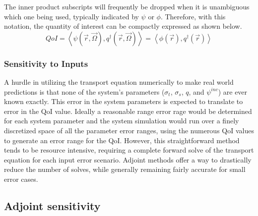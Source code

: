 \documentclass{article}
\newcommand{\vr}{\vec{r}}
\newcommand{\vO}{\vec{\Omega}}
\newcommand{\bra}{\left\langle}
\newcommand{\ket}{\right\rangle}
\newcommand{\sigt}{\sigma_t}
\newcommand{\sigs}{\sigma_s}
\newcommand{\angResp}{q^\dag}
\newcommand{\scalResp}{q^\dag}
\newcommand{\qoi}{QoI}
\begin{document}
The inner product subscripts will frequently be dropped when it is unambiguous which one being used, typically indicated by $\psi$ or $\phi$. Therefore, with this notation, the quantity of interest can be compactly expressed as shown below.
\begin{equation}
\label{QoIDef}
\qoi = \bra \psi(\vr,\vO), \angResp(\vr,\vO) \ket = \bra \phi(\vr) , \scalResp(\vr) \ket
\end{equation}

\subsubsection{Sensitivity to Inputs}
A hurdle in utilizing the transport equation numerically to make real world predictions is that none of the system's parameters ($\sigt$, $\sigs$, $q$, and $\psi^{inc}$) are ever known exactly. This error in the system parameters is expected to translate to error in the QoI value. Ideally a reasonable range error rage would be determined for each system parameter and the system simulation would run over a finely discretized space of all the parameter error ranges, using the numerous QoI values to generate an error range for the QoI. However, this straightforward method tends to be resource intensive, requiring a complete forward solve of the transport equation for each input error scenario. Adjoint methods offer a way to drastically reduce the number of solves, while generally remaining fairly accurate for small error cases.


\subsection{Adjoint sensitivity}
\end{document}
